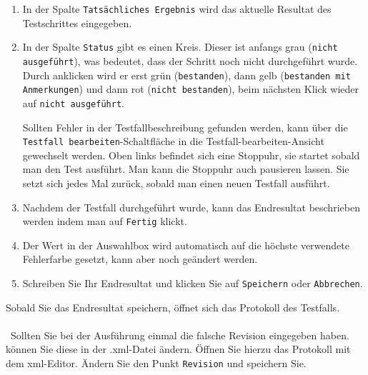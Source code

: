 \documentclass[11pt,a4paper,titlepage]{article}
\begin{document}
\begin{enumerate}
\item In der Spalte \texttt{Tatsächliches Ergebnis} wird das aktuelle Resultat des Testschrittes eingegeben.
\item In der Spalte \texttt{Status} gibt es einen Kreis. Dieser ist anfangs grau (\texttt{nicht ausgeführt}), was bedeutet, dass der Schritt noch nicht durchgeführt wurde.
Durch anklicken wird er erst grün (\texttt{bestanden}), dann gelb (\texttt{bestanden mit Anmerkungen}) und dann rot (\texttt{nicht bestanden}), beim nächsten Klick wieder auf \texttt{nicht ausgeführt}.

Sollten Fehler in der Testfallbeschreibung gefunden werden, kann über die \texttt{Testfall bearbeiten}-Schaltfläche in die Testfall-bearbeiten-Ansicht gewechselt werden.
Oben links befindet sich eine Stoppuhr, sie startet sobald man den Test ausführt. Man kann die Stoppuhr auch pausieren lassen. Sie setzt sich jedes Mal zurück, sobald man einen neuen Testfall ausführt. 

\item Nachdem der Testfall durchgeführt wurde, kann das Endresultat beschrieben werden indem man auf \texttt{Fertig} klickt.
\item Der Wert in der Auswahlbox wird automatisch auf die höchste verwendete Fehlerfarbe gesetzt, kann aber noch geändert werden.
\item Schreiben Sie Ihr Endresultat und klicken Sie auf \texttt{Speichern} oder \texttt{Abbrechen}.
\end{enumerate}
Sobald Sie das Endresultat speichern, öffnet sich das Protokoll des Testfalls.\\
\\\
Sollten Sie bei der Ausführung einmal die falsche Revision eingegeben haben. können Sie diese in der .xml-Datei ändern. Öffnen Sie hierzu das Protokoll mit dem xml-Editor. Ändern Sie den Punkt \texttt{Revision} und speichern Sie. 
\end{document}
